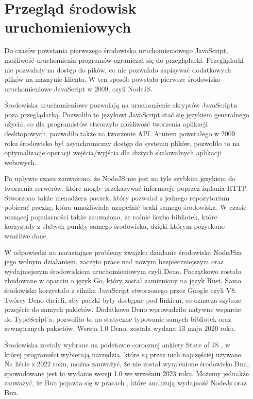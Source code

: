 \section{Przegląd środowisk uruchomieniowych}\label{env}
Do czasów powstania pierwszego środowiska uruchomieniowego JavaScript, możliwość uruchomienia programów ograniczał się do przeglądarki. Przeglądarki nie pozwalały na dostęp do pików, co nie pozwalało zapisywać dodatkowych plików na maszynie klienta. W ten sposób powstało pierwsze środowisko uruchomieniowe JavaScript w 2009, czyli NodeJS.

Środowiska uruchomieniowe pozwalają na uruchomienie skryptów JavaScriptu poza przeglądarką. Pozwoliło to językowi JavaScript stać się językiem generalnego użycia, co dla programistów stworzyło możliwość tworzenia aplikacji desktopowych, pozwoliło także na tworzenie API. Atutem powstałego w 2009 roku środowisko był asynchroniczny dostęp do systemu plików, pozwoliło to na optymalizacje operacji wejścia/wyjścia dla dużych skalowalnych aplikacji webowych.

Po upływie czasu zauważono, że NodeJS nie jest na tyle szybkim językiem do tworzenia serwerów, które mogły przekazywać informacje poprzez żądania HTTP. Stworzono także menadżera paczek, który pozwalał z jednego repozytorium pobierać paczkę, która umożliwiała uzupełnić braki samego środowiska. W czasie rosnącej popularności także zauważono, że rośnie liczba bibliotek, które korzystały z słabych punkty samego środowiska, dzięki którym pozyskano wrażliwe dane.

W odpowiedzi na narastające problemy związku działanie środowiska NodeJSm jego wolnym działaniem, zaczęto prace nad nowym bezpieczniejszym oraz wydajniejszym środowiskiem uruchomieniowym czyli Deno. Początkowo zostało zbudowane w oparciu o język Go, który został zamieniony na język Rust. Samo środowisko korzystało z silnika JavaScript stworzonego przez Google czyli V8. Twórcy Deno chcieli, aby paczki były dostępne pod linkiem, co oznacza szybsze przejście do samych pakietów. Dodatkowo Deno wprowadziło natywne wsparcie do TypeScript'a, pozwoliło to na statyczne typowanie samych bibliotek oraz zewnętrznych pakietów. Wersja 1.0 Deno, została wydana 13 maja 2020 roku.

Środowiska zostały wybrane na podstawie corocznej ankiety State of JS \cite{State_of_js:2022}, w której programiści wybierają narzędzia, które są przez nich najczęściej używane. Na liście z 2022 roku, można zauważyć, że nie został wymienione środowisko Bun,  spowodowane jest to wydanie wersji 1.0 we wrześniu 2023 roku. Możemy jednakże zauważyć, że Bun pojawia się w pracach \cite{NodeAndBun}, które analizują wydajność NodeJs oraz Bun.

